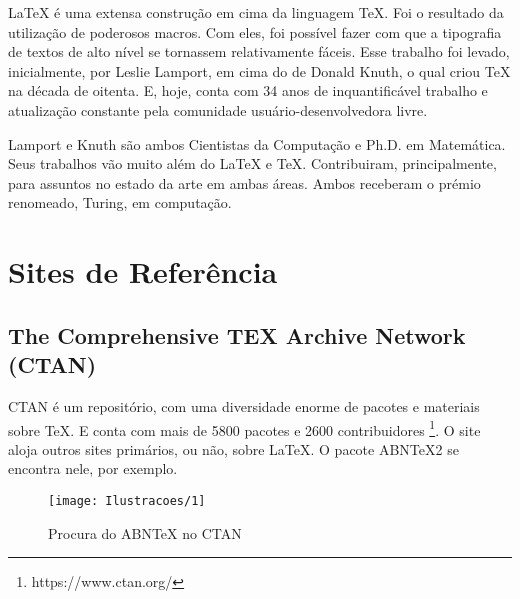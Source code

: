 \documentclass[12pt, brazilian, a5paper]{abntex2} %
\begin{document}

\LaTeX{} é uma extensa construção em cima da linguagem \TeX. Foi o
resultado da utilização de poderosos macros. Com eles, foi possível
fazer com que a tipografia de textos de alto nível se tornassem
relativamente fáceis. Esse trabalho foi levado, inicialmente, por
Leslie Lamport, em cima do de Donald Knuth, o qual criou \TeX{} na
década de oitenta. E, hoje, conta com 34 anos de inquantificável
trabalho e atualização constante pela comunidade
usuário-desenvolvedora livre.


Lamport e Knuth são ambos Cientistas da Computação e
Ph.D. em Matemática. Seus trabalhos vão muito além do \LaTeX{} e
\TeX. Contribuiram, principalmente, para assuntos no estado da arte
em ambas áreas. Ambos receberam o prémio renomeado, Turing, em
computação.

\clearpage
\section{Sites de Referência}
\subsection{The Comprehensive TEX Archive Network (CTAN)}

CTAN é um repositório, com uma diversidade enorme de pacotes e
materiais sobre \TeX. E conta com mais de 5800 pacotes e 2600
contribuidores \footnote{https://www.ctan.org/}. O site aloja outros
sites primários, ou não, sobre LaTeX. O pacote ABNTeX2 se encontra nele, por exemplo.

\begin{figure}[!htb]
  \caption{\label{abntex_site} Procura do ABNTeX no CTAN}
  \begin{center}
    \texttt{[image: Ilustracoes/1]}
  \end{center}
\end{figure}
\end{document}
